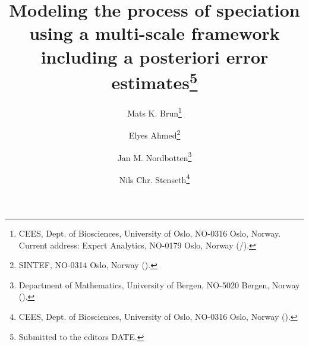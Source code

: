 \newcommand{\etaRKj}{\eta_{\textnormal{R},K,i}}
\newcommand{\etaDFj}{\eta_{\textnormal{DF},K,i}}
\newcommand{\etaghj}{\eta_{g,K,i}}
\newcommand{\etarhj}{\eta_{r,K,i}}

\newcommand{\dist}{\textnormal{dist}}


\newcommand{\creflastconjunction}{, and~}




\title{Modeling the process of speciation using a multi-scale framework including a posteriori error estimates\thanks{Submitted to the editors DATE.
}}

\author{
	Mats K. Brun\thanks{CEES, Dept. of Biosciences, University of Oslo, NO-0316 Oslo, Norway. Current address: Expert Analytics, NO-0179 Oslo, Norway 
  			(/).} 
	\and Elyes Ahmed\thanks{SINTEF, NO-0314 Oslo, Norway 
  			().}
	\and Jan M. Nordbotten\thanks{Department of Mathematics, University of Bergen, NO-5020 Bergen, Norway 
  			().}
	\and Nils Chr. Stenseth\thanks{CEES, Dept. of Biosciences, University of Oslo, NO-0316 Oslo, Norway 
  			().}
}
\usepackage{amsopn}
\DeclareMathOperator{\diag}{diag}


